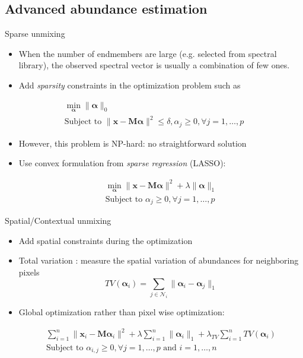 \documentclass[10pt,aspectratio=1610]{beamer}
\begin{document}
\subsection{Advanced abundance estimation}
\label{sec:org5cf7fb1}
\begin{frame}[label={sec:orgf2629a0}]{Sparse unmixing}
\begin{itemize}
\item When the number of endmembers are large (e.g. selected from spectral
library), the observed  spectral vector is usually  a combination of
few ones.
\item Add \emph{sparsity} constraints in the optimization problem such as
\end{itemize}
\begin{center}
  \begin{eqnarray*}
    \min_{\boldsymbol{\alpha}} \|\boldsymbol{\alpha}\|_{0} \\
    \text{Subject to } \|\mathbf{x}-\mathbf{M}\boldsymbol{\alpha}\|^2 \leq \delta, \alpha_j\geq 0, \forall j=1,\ldots,p
  \end{eqnarray*}
\end{center}
\begin{itemize}
\item However, this problem is NP-hard: no straightforward solution
\item Use convex formulation from \emph{sparse regression} (LASSO):
\begin{center}
\begin{eqnarray*}
\min_{\boldsymbol{\alpha}} \|\mathbf{x}-\mathbf{M}\boldsymbol{\alpha}\|^2  + \lambda \|\boldsymbol{\alpha}\|_{1}\\
\text{Subject to }\alpha_j\geq 0, \forall j=1,\ldots,p
\end{eqnarray*}
\end{center}
\end{itemize}
\end{frame}
\begin{frame}[label={sec:org3596036}]{Spatial/Contextual unmixing}
\begin{itemize}
\item Add spatial constraints during the optimization
\item Total variation \cite{DBLP:journals/tgrs/IordacheBP12}: measure the spatial variation of abundances for neighboring pixels
$$ TV(\boldsymbol{\alpha}_i) = \sum_{j\in \mathcal{N}_i} \|\boldsymbol{\alpha}_i-\boldsymbol{\alpha}_j\|_{1}$$
\item Global optimization rather than pixel wise optimization:
\begin{center}
  \begin{eqnarray*}
     \sum_{i=1}^n   \|\mathbf{x}_i-\mathbf{M}\boldsymbol{\alpha}_i\|^2 + \lambda \sum_{i=1}^n\|\boldsymbol{\alpha}_i\|_{1} + \lambda_{TV}\sum_{i=1}^nTV(\boldsymbol{\alpha}_i)\\
     \text{Subject to }\alpha_{i,j}\geq 0, \forall j=1,\ldots,p \text{ and } i=1,\ldots,n
  \end{eqnarray*}
\end{center}
\end{itemize}
\end{frame}
\end{document}
